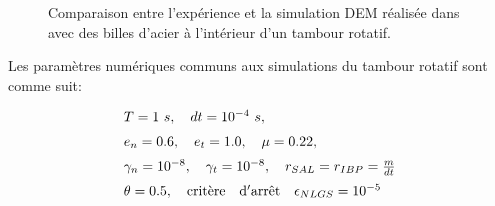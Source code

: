 \begin{figure}[h!]
	\begin{center}
	\end{center}
	\caption{Comparaison entre l'expérience et la simulation DEM réalisée dans \cite{maione2015investigation} avec des billes d'acier à l'intérieur d'un tambour rotatif.}
	\label{rise_repose_drum_experim}
\end{figure}

Les paramètres numériques communs aux simulations du tambour rotatif sont comme suit:

\begin{eqnarray*}
	\begin{array}{l}
	    T = 1\ s,\quad dt = 10^{-4}\ s, \nonumber \\[2mm]
		e_n = 0.6,\quad e_t = 1.0,\quad \mu = 0.22, \nonumber \\[2mm]
		\gamma_n = 10^{-8},\quad \gamma_t = 10^{-8}, \quad r_{SAL} = r_{IBP} = \frac{m}{dt} \nonumber  \\[2mm]
		\theta = 0.5,\quad {\rm crit\grave{e}re \quad d'arr\hat{e}t} \quad \epsilon_{NLGS} = 10^{-5}
	\end{array}
\end{eqnarray*}

